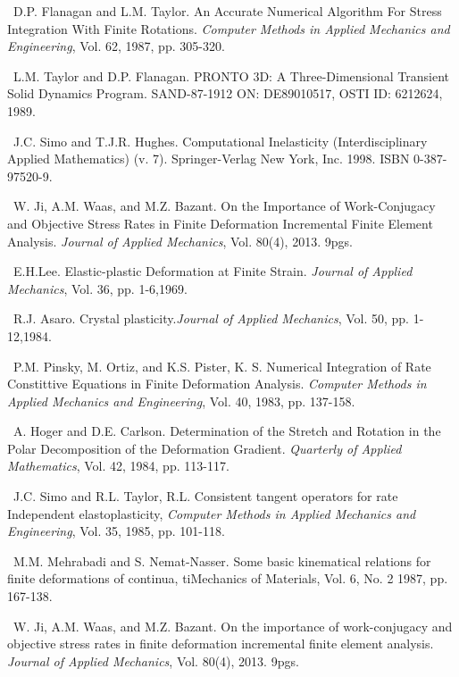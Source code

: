 \documentclass[11pt]{report}
\numberwithin{equation}{section}
\newcommand{\ti}{\emph}
\newcounter{sectrefs}
\begin{document}
\medskip
{}~D.P. Flanagan and L.M. Taylor.
An Accurate Numerical Algorithm For Stress Integration With Finite Rotations.
\ti{Computer Methods in Applied Mechanics and Engineering},
 Vol. 62, 1987, pp. 305-320.

\medskip
{}~L.M. Taylor and D.P. Flanagan.
PRONTO 3D: A Three-Dimensional Transient Solid Dynamics Program. SAND-87-1912 ON: DE89010517,
OSTI ID: 6212624, 1989.

\medskip
{}~J.C. Simo and T.J.R. Hughes.  
Computational Inelasticity (Interdisciplinary Applied Mathematics) (v. 7).  Springer-Verlag New York, Inc. 1998.
ISBN 0-387-97520-9.

\medskip
{}~W. Ji, A.M. Waas, and M.Z. Bazant. 
On the Importance of Work-Conjugacy and Objective Stress Rates in
Finite Deformation Incremental Finite Element Analysis.
\ti{Journal of Applied Mechanics},  Vol. 80(4), 2013. 9pgs.
 
\medskip
{}~E.H.Lee.
Elastic-plastic Deformation at Finite Strain.
\ti{Journal of Applied Mechanics},  Vol. 36, pp. 1-6,1969.
 
\medskip
{}~R.J. Asaro.
Crystal plasticity.\ti{Journal of Applied Mechanics},  Vol. 50, pp. 1-12,1984.

\medskip
{}~P.M. Pinsky, M. Ortiz, and K.S. 
Pister, K. S.
Numerical Integration of Rate Constittive Equations in Finite Deformation Analysis.
\ti{Computer Methods in Applied Mechanics and Engineering}, Vol. 40, 1983, pp. 137-158.
 
\medskip
{}~A. Hoger and D.E. Carlson.
Determination of the Stretch and Rotation in the Polar Decomposition of the 
Deformation Gradient. \ti{Quarterly of Applied Mathematics}, Vol. 42, 1984, pp. 113-117.


\medskip
{}~J.C. Simo and R.L. Taylor, R.L.
Consistent tangent operators for rate Independent elastoplasticity,
\ti{Computer Methods in Applied Mechanics and Engineering}, Vol. 35, 1985, pp. 101-118.


\medskip
{}~M.M. Mehrabadi and S. Nemat-Nasser.
Some basic kinematical relations for finite deformations of continua,
ti{Mechanics of Materials}, Vol. 6, No. 2 1987, pp. 167-138.

\medskip
{}~W. Ji, A.M. Waas, and M.Z. Bazant. 
On the importance of work-conjugacy and objective stress rates in finite deformation incremental finite element analysis.
\ti{Journal of Applied Mechanics},  Vol. 80(4), 2013. 9pgs.
\end{document}
